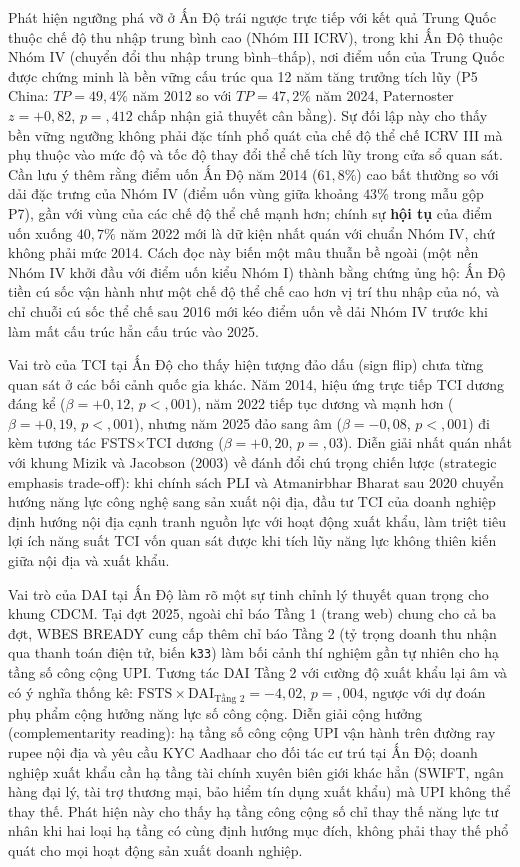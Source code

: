 \documentclass[
  a4paper,
  13pt]{extreport}
\begin{document}
Phát hiện ngưỡng phá vỡ ở Ấn Độ trái ngược trực tiếp với kết quả Trung
Quốc thuộc chế độ thu nhập trung bình cao (Nhóm III ICRV), trong khi Ấn
Độ thuộc Nhóm IV (chuyển đổi thu nhập trung bình--thấp), nơi điểm uốn
của Trung Quốc được chứng minh là bền vững cấu trúc qua 12 năm tăng
trưởng tích lũy (P5 China: \(TP = 49{,}4\%\) năm 2012 so với
\(TP = 47{,}2\%\) năm 2024, Paternoster \(z = +{0,}82\), \(p = {,}412\)
chấp nhận giả thuyết cân bằng). Sự đối lập này cho thấy bền vững ngưỡng
không phải đặc tính phổ quát của chế độ thể chế ICRV III mà phụ thuộc
vào mức độ và tốc độ thay đổi thể chế tích lũy trong cửa sổ quan sát.
Cần lưu ý thêm rằng điểm uốn Ấn Độ năm 2014 (\(61{,}8\%\)) cao bất
thường so với dải đặc trưng của Nhóm IV (điểm uốn vùng giữa khoảng
\(43\%\) trong mẫu gộp P7), gần với vùng của các chế độ thể chế mạnh
hơn; chính sự \textbf{hội tụ} của điểm uốn xuống \(40{,}7\%\) năm 2022
mới là dữ kiện nhất quán với chuẩn Nhóm IV, chứ không phải mức 2014.
Cách đọc này biến một mâu thuẫn bề ngoài (một nền Nhóm IV khởi đầu với
điểm uốn kiểu Nhóm I) thành bằng chứng ủng hộ: Ấn Độ tiền cú sốc vận
hành như một chế độ thể chế cao hơn vị trí thu nhập của nó, và chỉ chuỗi
cú sốc thể chế sau 2016 mới kéo điểm uốn về dải Nhóm IV trước khi làm
mất cấu trúc hẳn cấu trúc vào 2025.

Vai trò của TCI tại Ấn Độ cho thấy hiện tượng đảo dấu (sign flip) chưa
từng quan sát ở các bối cảnh quốc gia khác. Năm 2014, hiệu ứng trực tiếp
TCI dương đáng kể (\(\beta = +0{,}12\), \(p < {,}001\)), năm 2022 tiếp
tục dương và mạnh hơn (\(\beta = +0{,}19\), \(p < {,}001\)), nhưng năm
2025 đảo sang âm (\(\beta = -0{,}08\), \(p < {,}001\)) đi kèm tương tác
FSTS\(\times\)TCI dương (\(\beta = +0{,}20\), \(p = {,}03\)). Diễn giải
nhất quán nhất với khung Mizik và Jacobson (2003) về đánh đổi chú trọng
chiến lược (strategic emphasis trade-off): khi chính sách PLI và
Atmanirbhar Bharat sau 2020 chuyển hướng năng lực công nghệ sang sản
xuất nội địa, đầu tư TCI của doanh nghiệp định hướng nội địa cạnh tranh
nguồn lực với hoạt động xuất khẩu, làm triệt tiêu lợi ích năng suất TCI
vốn quan sát được khi tích lũy năng lực không thiên kiến giữa nội địa và
xuất khẩu.

Vai trò của DAI tại Ấn Độ làm rõ một sự tinh chỉnh lý thuyết quan trọng
cho khung CDCM. Tại đợt 2025, ngoài chỉ báo Tầng 1 (trang web) chung cho
cả ba đợt, WBES BREADY cung cấp thêm chỉ báo Tầng 2 (tỷ trọng doanh thu
nhận qua thanh toán điện tử, biến \texttt{k33}) làm bối cảnh thí nghiệm
gần tự nhiên cho hạ tầng số công cộng UPI. Tương tác DAI Tầng 2 với
cường độ xuất khẩu lại âm và có ý nghĩa thống kê:
\(\text{FSTS} \times \text{DAI}_{\text{Tầng 2}} = -4{,}02\),
\(p = {,}004\), ngược với dự đoán phụ phẩm cộng hưởng năng lực số công
cộng. Diễn giải cộng hưởng (complementarity reading): hạ tầng số công
cộng UPI vận hành trên đường ray rupee nội địa và yêu cầu KYC Aadhaar
cho đối tác cư trú tại Ấn Độ; doanh nghiệp xuất khẩu cần hạ tầng tài
chính xuyên biên giới khác hẳn (SWIFT, ngân hàng đại lý, tài trợ thương
mại, bảo hiểm tín dụng xuất khẩu) mà UPI không thể thay thế. Phát hiện
này cho thấy hạ tầng công cộng số chỉ thay thế năng lực tư nhân khi hai
loại hạ tầng có cùng định hướng mục đích, không phải thay thế phổ quát
cho mọi hoạt động sản xuất doanh nghiệp.
\end{document}
